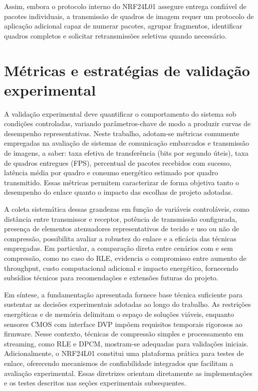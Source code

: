 \documentclass[repeatfields,xlists,xpacks,oneside]{ufrgscca}
\begin{document}
Assim, embora o protocolo interno do NRF24L01 assegure entrega confiável de pacotes individuais, a transmissão de quadros de imagem requer um protocolo de aplicação adicional capaz de numerar pacotes, agrupar fragmentos, identificar quadros completos e solicitar retransmissões seletivas quando necessário.

\section{Métricas e estratégias de validação experimental}

A validação experimental deve quantificar o comportamento do sistema sob condições controladas, variando parâmetros-chave de modo a produzir curvas de desempenho representativas. Neste trabalho, adotam-se métricas comumente empregadas na avaliação de sistemas de comunicação embarcados e transmissão de imagens, a saber: taxa efetiva de transferência (bits por segundo úteis), taxa de quadros entregues (FPS), percentual de pacotes recebidos com sucesso, latência média por quadro e consumo energético estimado por quadro transmitido. Essas métricas permitem caracterizar de forma objetiva tanto o desempenho do enlace quanto o impacto das escolhas de projeto adotadas.

A coleta sistemática dessas grandezas em função de variáveis controláveis, como distância entre transmissor e receptor, potência de transmissão configurada, presença de elementos atenuadores representativos de tecido e uso ou não de compressão, possibilita avaliar a robustez do enlace e a eficácia das técnicas empregadas. Em particular, a comparação direta entre cenários com e sem compressão, como no caso do RLE, evidencia o compromisso entre aumento de throughput, custo computacional adicional e impacto energético, fornecendo subsídios técnicos para recomendações e extensões futuras do projeto.

Em síntese, a fundamentação apresentada fornece base técnica suficiente para sustentar as decisões experimentais adotadas ao longo do trabalho. As restrições energéticas e de memória delimitam o espaço de soluções viáveis, enquanto sensores CMOS com interface DVP impõem requisitos temporais rigorosos ao firmware. Nesse contexto, técnicas de compressão simples e processamento em streaming, como RLE e DPCM, mostram-se adequadas para validações iniciais. Adicionalmente, o NRF24L01 constitui uma plataforma prática para testes de enlace, oferecendo mecanismos de confiabilidade integrados que facilitam a avaliação experimental. Essas diretrizes orientam diretamente as implementações e os testes descritos nas seções experimentais subsequentes.
\end{document}
